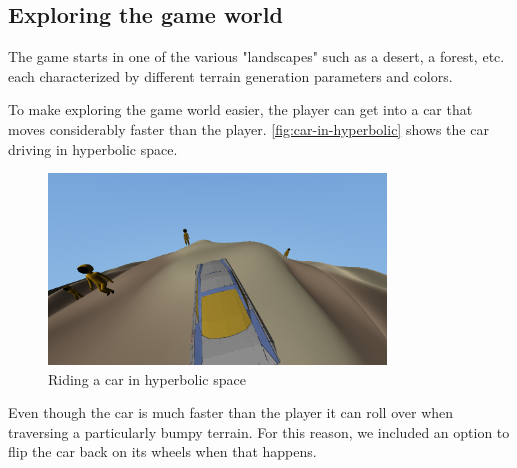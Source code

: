 \subsection{Exploring the game world}
The game starts in one of the various "landscapes" such as a desert, a forest, etc. each characterized by different terrain generation parameters and colors.

To make exploring the game world easier, the player can get into a car that moves considerably faster than the player.
\autoref{fig:car-in-hyperbolic} shows the car driving in hyperbolic space.
\begin{figure}[!htb]
    \centering
    \includegraphics[width=0.8\textwidth]{chapters/results/sections/gameplay/resources/car-in-hyperbolic.png}
    \caption{Riding a car in hyperbolic space}
    \label{fig:car-in-hyperbolic}
\end{figure}
Even though the car is much faster than the player it can roll over when traversing a particularly bumpy terrain.
For this reason, we included an option to flip the car back on its wheels when that happens.